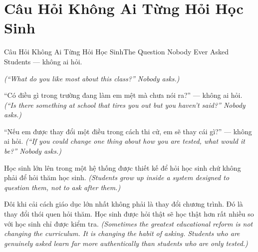 \section{Câu Hỏi Không Ai Từng Hỏi Học Sinh}
\begin{truyen}{Câu Hỏi Không Ai Từng Hỏi Học Sinh}{The Question Nobody Ever Asked Students}
 --- không ai hỏi.

\textit{(``What do you like most about this class?'' Nobody asks.)}

``Có điều gì trong trường đang làm em mệt mà chưa nói ra?'' --- không ai hỏi.
\textit{(``Is there something at school that tires you out but you haven't said?'' Nobody asks.)}

``Nếu em được thay đổi một điều trong cách thi cử, em sẽ thay cái gì?'' --- không ai hỏi.
\textit{(``If you could change one thing about how you are tested, what would it be?'' Nobody asks.)}

Học sinh lớn lên trong một hệ thống được thiết kế để hỏi học sinh chứ không phải để hỏi thăm học sinh.
\textit{(Students grow up inside a system designed to question them, not to ask after them.)}

\begin{baihoc}
Đôi khi cải cách giáo dục lớn nhất không phải là thay đổi chương trình. Đó là thay đổi thói quen hỏi thăm. Học sinh được hỏi thật sẽ học thật hơn rất nhiều so với học sinh chỉ được kiểm tra.
\textit{(Sometimes the greatest educational reform is not changing the curriculum. It is changing the habit of asking. Students who are genuinely asked learn far more authentically than students who are only tested.)}
\end{baihoc}
\end{truyen}

